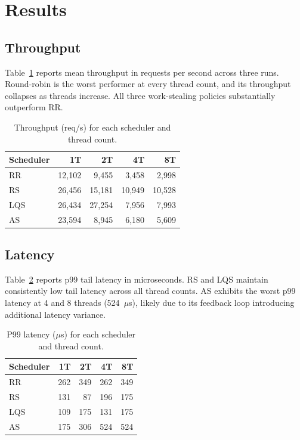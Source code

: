 \documentclass[conference]{IEEEtran}
\begin{document}
\section{Results}

\subsection{Throughput}

Table~\ref{tab:throughput} reports mean throughput in requests per second across three runs. Round-robin is the worst performer at every thread count, and its throughput collapses as threads increase. All three work-stealing policies substantially outperform RR.

\begin{table}[htbp]
\centering
\caption{Throughput (req/s) for each scheduler and thread count.}
\label{tab:throughput}
\begin{tabular}{lrrrr}
\toprule
Scheduler & 1T & 2T & 4T & 8T \\
\midrule
RR  & 12,102 &  9,455 & 3,458 & 2,998 \\
RS  & 26,456 & 15,181 & 10,949 & 10,528 \\
LQS & 26,434 & 27,254 & 7,956  & 7,993 \\
AS  & 23,594 & 8,945  & 6,180  & 5,609 \\
\bottomrule
\end{tabular}
\end{table}

\subsection{Latency}

Table~\ref{tab:latency} reports p99 tail latency in microseconds. RS and LQS maintain consistently low tail latency across all thread counts. AS exhibits the worst p99 latency at 4 and 8 threads (524~$\mu$s), likely due to its feedback loop introducing additional latency variance.

\begin{table}[htbp]
\centering
\caption{P99 latency ($\mu$s) for each scheduler and thread count.}
\label{tab:latency}
\begin{tabular}{lrrrr}
\toprule
Scheduler & 1T  & 2T  & 4T  & 8T  \\
\midrule
RR  & 262 & 349 & 262 & 349 \\
RS  & 131 & 87  & 196 & 175 \\
LQS & 109 & 175 & 131 & 175 \\
AS  & 175 & 306 & 524 & 524 \\
\bottomrule
\end{tabular}
\end{table}
\end{document}
